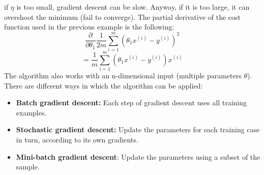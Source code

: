 if $\eta$ is too small, gradient descent can be slow. Anyway, if it is too large, it can overshoot the minimum (fail to converge).\newline
The partial derivative of the cost function used in the previous example is the following:
\[\frac{\partial}{\partial \theta_{1}} \frac{1}{2m}\sum_{i=1}^{m}(\theta_{1}x^{(i)} - y^{(i)})^{2}\]
\[= \frac{1}{m}\sum_{i=1}^{m}(\theta_{1}x^{(i)} - y^{(i)})x^{(i)}\]
The algorithm also works with an n-dimensional input (multiple parameters $\theta$).
There are different ways in which the algorithm can be applied:
\begin{itemize}
    \item \textbf{Batch gradient descent:} Each step of gradient descent uses all training examples.
    \item \textbf{Stochastic gradient descent:} Update the parameters for each training case in turn, according to its own gradients.
    \item \textbf{Mini-batch gradient descent}: Update the parameters using a subset of the sample.
\end{itemize}

